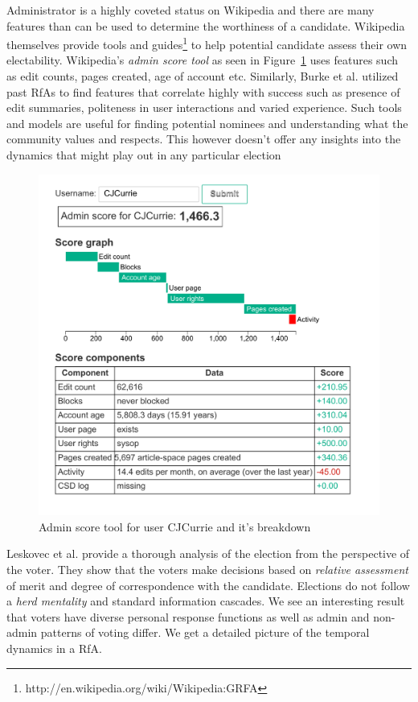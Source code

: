 Administrator is a highly coveted status on Wikipedia and there are many features than can be used to determine the worthiness of a candidate. Wikipedia themselves provide tools and guides\footnote{http://en.wikipedia.org/wiki/Wikipedia:GRFA} to help potential candidate assess their own electability. Wikipedia's \textit{admin score tool} as seen in Figure~\ref{fig:admin-score} uses features such as edit counts, pages created, age of account etc. Similarly, Burke et al. \cite{BurkeMoppingUp} utilized past RfAs to find features that correlate highly with success such as presence of edit summaries, politeness in user interactions and varied experience. Such tools and models are useful for finding potential nominees and understanding what the community values and respects. This however doesn't offer any insights into the dynamics that might play out in any particular election
\begin{figure}[h!]
    \centering
    \includegraphics[width=\linewidth]{images/Asynchronous Admin Score.pdf}
    \caption{Admin score tool for user CJCurrie and it's breakdown}
    \label{fig:admin-score}
\end{figure}
\smallskip

Leskovec et al. provide a thorough analysis of the election from the perspective of the voter. They show that the voters make decisions based on \textit{relative assessment} of merit and degree of correspondence with the candidate. Elections do not follow a \textit{herd mentality} and standard information cascades. We see an interesting result that voters have diverse personal response functions as well as admin and non-admin patterns of voting differ. \cite{leskovec2010governance} We get a detailed picture of the temporal dynamics in a RfA.
\smallskip

